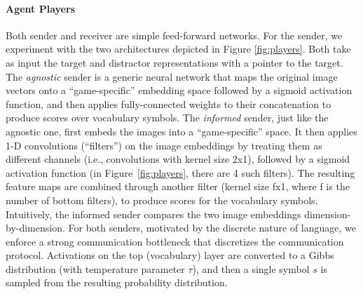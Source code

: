 \paragraph{Agent Players} Both sender and receiver are simple
feed-forward networks.  For the sender, we experiment with the two
architectures depicted in Figure \ref{fig:players}. Both take as input
the target and distractor representations with a pointer to the
target. The \emph{agnostic} sender is a generic neural network that
maps the original image vectors onto a ``game-specific'' embedding
space followed by a sigmoid activation function, and then applies fully-connected weights to their concatenation
to produce scores over vocabulary symbols.  The
\emph{informed} sender, just like the agnostic one, first embeds the
images into a ``game-specific'' space. It then applies 1-D
convolutions (``filters'') on the image embeddings by treating them as
different channels (i.e., convolutions with kernel size 2x1), followed by a sigmoid activation function (in
Figure~\ref{fig:players}, there are 4 such filters). The resulting
feature maps are combined through another filter (kernel size fx1, where f is the number of bottom filters),  to produce scores for
the vocabulary symbols. 
Intuitively, the informed sender compares the two image embeddings
dimension-by-dimension. For both senders, motivated by the discrete
nature of language, we enforce a strong
communication bottleneck that discretizes the communication
protocol. Activations  on the top (vocabulary) layer 
are converted to a Gibbs distribution 
(with temperature parameter $\tau$), and then a
single symbol $s$ is sampled from the resulting probability
distribution.

